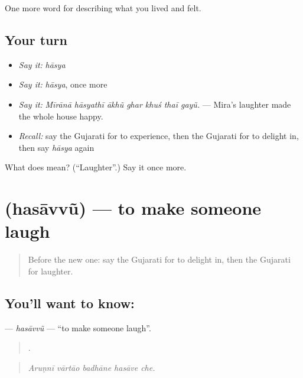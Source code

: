 \begin{grammarlens}[title={What you've built}]
One more word for describing what you lived and felt.
\end{grammarlens}

\subsection*{Your turn}
\begin{itemize}
\raggedright
  \item \emph{Say it:} \emph{hāsya}
  \item \emph{Say it:} \emph{hāsya}, once more
  \item \emph{Say it:} \emph{Mīrānā hāsyathī ākhũ ghar khuś thaī gayũ.} — Mira's laughter made the whole house happy.
  \item \emph{Recall:} say the Gujarati for to experience, then the Gujarati for to delight in, then say \emph{hāsya} again
\end{itemize}

\begin{tcolorbox}[breakable,colback=teal!4,colframe=teal!35!black,title={Before you move on}]
What does  mean? (\textquotedblleft{}Laughter\textquotedblright{}.) Say it once more.
\end{tcolorbox}
\section[\texorpdfstring{\gu{હસાવવું} (hasāvvũ)}{હસાવવું (hasāvvũ)}]{ (hasāvvũ) — to make someone laugh}

\label{lesson:GU-C448-hasavvu}



\begin{quote}
Before the new one: say the Gujarati for to delight in, then the Gujarati for laughter.
\end{quote}

\subsection*{You'll want to know: }
\textbf{} — \emph{hasāvvũ} — \textquotedblleft{}to make someone laugh\textquotedblright{}.

\begin{quote}
    .
\end{quote}

\begin{quote}
\emph{Aruṇnī vārtāo badhāne hasāve che.}
\end{quote}

